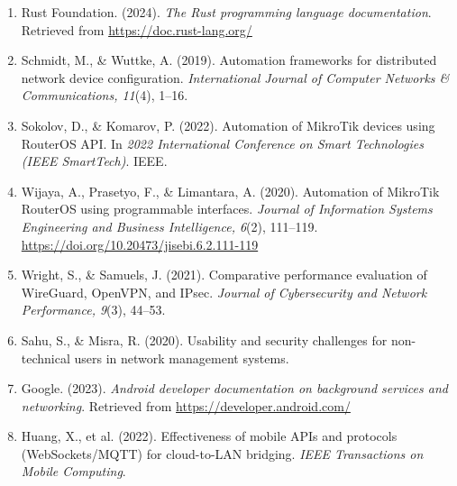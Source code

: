 \documentclass[12pt,a4paper,oneside]{report}
\begin{document}
\begin{enumerate}
\item Rust Foundation. (2024). \textit{The Rust programming language documentation}. Retrieved from \url{https://doc.rust-lang.org/}

\item Schmidt, M., \& Wuttke, A. (2019). Automation frameworks for distributed network device configuration. \textit{International Journal of Computer Networks \& Communications, 11}(4), 1--16.

\item Sokolov, D., \& Komarov, P. (2022). Automation of MikroTik devices using RouterOS API. In \textit{2022 International Conference on Smart Technologies (IEEE SmartTech)}. IEEE.

\item Wijaya, A., Prasetyo, F., \& Limantara, A. (2020). Automation of MikroTik RouterOS using programmable interfaces. \textit{Journal of Information Systems Engineering and Business Intelligence, 6}(2), 111--119. \url{https://doi.org/10.20473/jisebi.6.2.111-119}

\item Wright, S., \& Samuels, J. (2021). Comparative performance evaluation of WireGuard, OpenVPN, and IPsec. \textit{Journal of Cybersecurity and Network Performance, 9}(3), 44--53.

\item Sahu, S., \& Misra, R. (2020). Usability and security challenges for non-technical users in network management systems.

\item Google. (2023). \textit{Android developer documentation on background services and networking}. Retrieved from \url{https://developer.android.com/}

\item Huang, X., et al. (2022). Effectiveness of mobile APIs and protocols (WebSockets/MQTT) for cloud-to-LAN bridging. \textit{IEEE Transactions on Mobile Computing}.

\end{enumerate}
\end{document}

